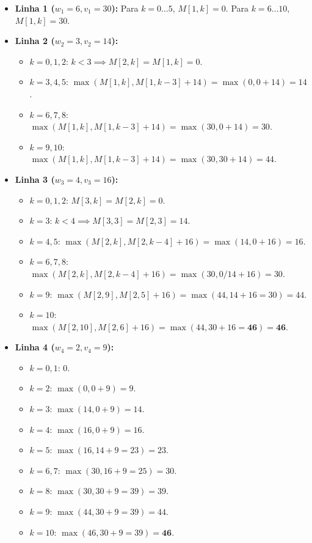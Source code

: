\documentclass[11pt,a4paper]{article}
\begin{document}
\begin{itemize}
    \item \textbf{Linha 1 ($w_1 = 6, v_1 = 30$):}
    Para $k = 0 \dots 5$, $M[1, k] = 0$. Para $k = 6 \dots 10$, $M[1, k] = 30$.
    \item \textbf{Linha 2 ($w_2 = 3, v_2 = 14$):}
    \begin{itemize}
        \item $k = 0, 1, 2$: $k < 3 \implies M[2, k] = M[1, k] = 0$.
        \item $k = 3, 4, 5$: $\max(M[1, k], M[1, k-3] + 14) = \max(0, 0 + 14) = 14$.
        \item $k = 6, 7, 8$: $\max(M[1, k], M[1, k-3] + 14) = \max(30, 0 + 14) = 30$.
        \item $k = 9, 10$: $\max(M[1, k], M[1, k-3] + 14) = \max(30, 30 + 14) = 44$.
    \end{itemize}
    \item \textbf{Linha 3 ($w_3 = 4, v_3 = 16$):}
    \begin{itemize}
        \item $k = 0, 1, 2$: $M[3, k] = M[2, k] = 0$.
        \item $k = 3$: $k < 4 \implies M[3, 3] = M[2, 3] = 14$.
        \item $k = 4, 5$: $\max(M[2, k], M[2, k-4] + 16) = \max(14, 0 + 16) = 16$.
        \item $k = 6, 7, 8$: $\max(M[2, k], M[2, k-4] + 16) = \max(30, 0/14 + 16) = 30$.
        \item $k = 9$: $\max(M[2, 9], M[2, 5] + 16) = \max(44, 14 + 16 = 30) = 44$.
        \item $k = 10$: $\max(M[2, 10], M[2, 6] + 16) = \max(44, 30 + 16 = \mathbf{46}) = \mathbf{46}$.
    \end{itemize}
    \item \textbf{Linha 4 ($w_4 = 2, v_4 = 9$):}
    \begin{itemize}
        \item $k = 0, 1$: $0$.
        \item $k = 2$: $\max(0, 0 + 9) = 9$.
        \item $k = 3$: $\max(14, 0 + 9) = 14$.
        \item $k = 4$: $\max(16, 0 + 9) = 16$.
        \item $k = 5$: $\max(16, 14 + 9 = 23) = 23$.
        \item $k = 6, 7$: $\max(30, 16 + 9 = 25) = 30$.
        \item $k = 8$: $\max(30, 30 + 9 = 39) = 39$.
        \item $k = 9$: $\max(44, 30 + 9 = 39) = 44$.
        \item $k = 10$: $\max(46, 30 + 9 = 39) = \mathbf{46}$.
    \end{itemize}
\end{itemize}
\end{document}
